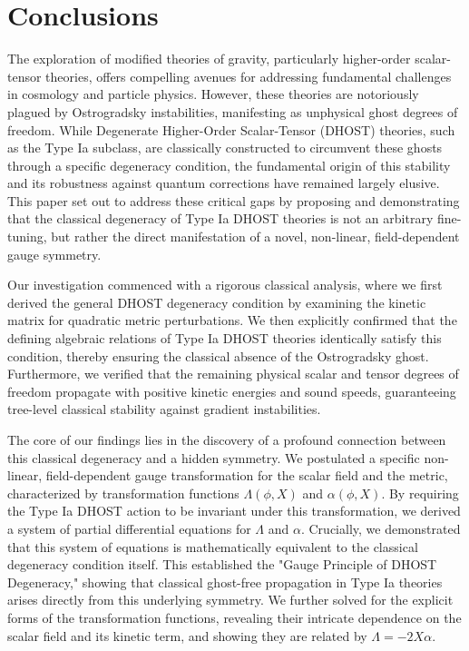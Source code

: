 \documentclass[twocolumn]{aastex631}
\begin{document}
\section{Conclusions}
\label{sec:conclusions}
\label{sec:conclusions}
The exploration of modified theories of gravity, particularly higher-order scalar-tensor theories, offers compelling avenues for addressing fundamental challenges in cosmology and particle physics. However, these theories are notoriously plagued by Ostrogradsky instabilities, manifesting as unphysical ghost degrees of freedom. While Degenerate Higher-Order Scalar-Tensor (DHOST) theories, such as the Type Ia subclass, are classically constructed to circumvent these ghosts through a specific degeneracy condition, the fundamental origin of this stability and its robustness against quantum corrections have remained largely elusive. This paper set out to address these critical gaps by proposing and demonstrating that the classical degeneracy of Type Ia DHOST theories is not an arbitrary fine-tuning, but rather the direct manifestation of a novel, non-linear, field-dependent gauge symmetry.

Our investigation commenced with a rigorous classical analysis, where we first derived the general DHOST degeneracy condition by examining the kinetic matrix for quadratic metric perturbations. We then explicitly confirmed that the defining algebraic relations of Type Ia DHOST theories identically satisfy this condition, thereby ensuring the classical absence of the Ostrogradsky ghost. Furthermore, we verified that the remaining physical scalar and tensor degrees of freedom propagate with positive kinetic energies and sound speeds, guaranteeing tree-level classical stability against gradient instabilities.

The core of our findings lies in the discovery of a profound connection between this classical degeneracy and a hidden symmetry. We postulated a specific non-linear, field-dependent gauge transformation for the scalar field and the metric, characterized by transformation functions $\Lambda(\phi, X)$ and $\alpha(\phi, X)$. By requiring the Type Ia DHOST action to be invariant under this transformation, we derived a system of partial differential equations for $\Lambda$ and $\alpha$. Crucially, we demonstrated that this system of equations is mathematically equivalent to the classical degeneracy condition itself. This established the "Gauge Principle of DHOST Degeneracy," showing that classical ghost-free propagation in Type Ia theories arises directly from this underlying symmetry. We further solved for the explicit forms of the transformation functions, revealing their intricate dependence on the scalar field and its kinetic term, and showing they are related by $\Lambda = -2X\alpha$.
\end{document}
